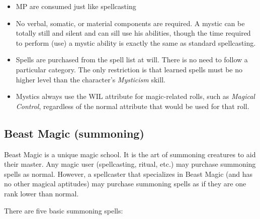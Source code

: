 \begin{itemize}
\item MP are consumed just like spellcasting
\item No verbal, somatic, or material components are required.  A
  mystic can be totally still and silent and can sill use his
  abilities, though the time required to perform (use) a mystic
  ability is exactly the same as standard spellcasting.
\item Spells are purchased from the spell list at will.  There is no
  need to follow a particular category.  The only restriction is that
  learned spells must be no higher level than the character's
  \emph{Mysticism} skill.
\item Mystics always use the WIL attribute for magic-related rolls,
  such as \emph{Magical Control}, regardless of the normal attribute
  that would be used for that roll.
\end{itemize}

\subsection{Beast Magic (summoning)}

Beast Magic is a unique magic school.  It is the art of summoning
creatures to aid their master.  Any magic user (spellcasting, ritual,
etc.) may purchase summoning spells as normal.  However, a spellcaster
that specializes in Beast Magic (and has no other magical aptitudes)
may purchase summoning spells as if they are one rank lower than
normal.

There are five basic summoning spells:

